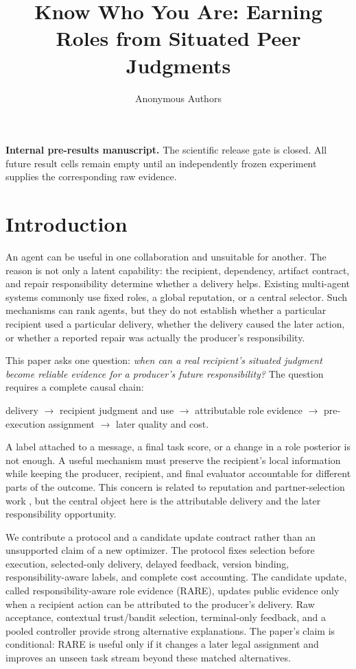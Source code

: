 \documentclass[sigconf,anonymous]{aamas}
\title[Know Who You Are]{Know Who You Are: Earning Roles from Situated Peer Judgments}
\author{Anonymous Authors}
\affiliation{\institution{Internal research draft}}
\begin{document}
\maketitle
\noindent\textbf{Internal pre-results manuscript.} The scientific release gate is closed.
All future result cells remain empty until an independently frozen experiment supplies
the corresponding raw evidence.

\section{Introduction}

An agent can be useful in one collaboration and unsuitable for another. The reason is
not only a latent capability: the recipient, dependency, artifact contract, and repair
responsibility determine whether a delivery helps. Existing multi-agent systems commonly
use fixed roles, a global reputation, or a central selector. Such mechanisms can rank
agents, but they do not establish whether a particular recipient used a particular
delivery, whether the delivery caused the later action, or whether a reported repair was
actually the producer's responsibility.

This paper asks one question: \emph{when can a real recipient's situated judgment become
reliable evidence for a producer's future responsibility?} The question requires a
complete causal chain:

\begin{center}
delivery $\rightarrow$ recipient judgment and use $\rightarrow$
attributable role evidence $\rightarrow$ pre-execution assignment $\rightarrow$
later quality and cost.
\end{center}

A label attached to a message, a final task score, or a change in a role posterior is not
enough. A useful mechanism must preserve the recipient's local information while keeping
the producer, recipient, and final evaluator accountable for different parts of the
outcome. This concern is related to reputation and partner-selection work
\cite{ren2026reputation,leung2025partner,russell2026partner}, but the central object here
is the attributable delivery and the later responsibility opportunity.

We contribute a protocol and a candidate update contract rather than an unsupported
claim of a new optimizer. The protocol fixes selection before execution, selected-only
delivery, delayed feedback, version binding, responsibility-aware labels, and complete
cost accounting. The candidate update, called responsibility-aware role evidence (RARE),
updates public evidence only when a recipient action can be attributed to the producer's
delivery. Raw acceptance, contextual trust/bandit selection, terminal-only feedback, and
a pooled controller provide strong alternative explanations. The paper's claim is
conditional: RARE is useful only if it changes a later legal assignment and improves an
unseen task stream beyond these matched alternatives.
\end{document}
